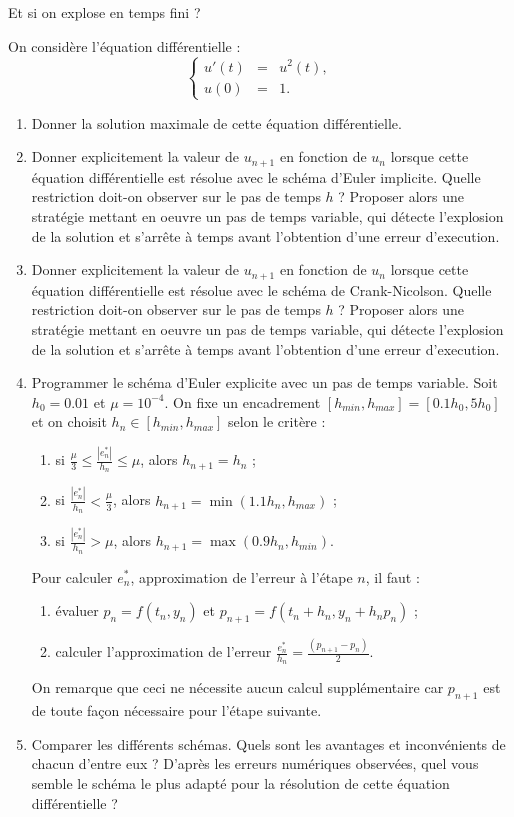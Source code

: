 \documentclass[a4paper,12pt,reqno]{amsart}
\begin{document}
\begin{exo} Et si on explose en temps fini ?

On consid\`ere l'\'equation diff\'erentielle :
$$
\left\{
\begin{array}{lcl}
u'(t)&=&u^2(t), \\
u(0)&=&1.
\end{array}
\right.
$$
\begin{enumerate}
\item Donner la solution maximale de cette \'equation diff\'erentielle.
\item
Donner explicitement la valeur de $u_{n+1}$ en fonction de $u_n$ lorsque cette \'equation 
diff\'erentielle est r\'esolue avec le sch\'ema d'Euler implicite. Quelle restriction doit-on observer sur le pas de temps $h$ ?  
Proposer alors une strat\'egie mettant en oeuvre un pas de temps variable, qui d\'etecte l'explosion de la solution et s'arr\^ete \`a temps avant l'obtention d'une erreur d'execution.
\item Donner explicitement la valeur de $u_{n+1}$ en fonction de $u_n$ lorsque cette \'equation 
diff\'erentielle est r\'esolue avec le sch\'ema de Crank-Nicolson. Quelle restriction doit-on observer sur le pas de temps $h$ ?  
Proposer alors une strat\'egie mettant en oeuvre un pas de temps variable, qui d\'etecte l'explosion de la solution et s'arr\^ete \`a temps avant l'obtention d'une erreur d'execution.
\item Programmer le sch\'ema d'Euler explicite avec un pas de temps variable. Soit $h_0=0.01$ et $\mu=10^{-4}$.
On fixe un encadrement $[h_{min},h_{max}]=[0.1 h_0, 5 h_0]$ et on choisit $h_n \in [h_{min},h_{max}]$ selon le crit\`ere :
\begin{enumerate}
\item si $\frac \mu 3 \leq \frac{|e^*_n|}{h_n} \leq \mu$, alors $h_{n+1}=h_n$ ;
\item si $\frac{|e^*_n|}{h_n} < \frac \mu 3$, alors $h_{n+1}=\min(1.1 h_n,h_{max})$ ;
\item si $\frac{|e^*_n|}{h_n} > \mu$, alors $h_{n+1}=\max(0.9 h_n,h_{min})$.
\end{enumerate}
Pour calculer $e^*_n$, approximation de l'erreur \`a l'\'etape $n$, il faut :
\begin{enumerate}
\item \'evaluer $p_n=f(t_n,y_n)$ et $p_{n+1}=f(t_n+h_n,y_n+h_n p_n)$ ;
\item calculer l'approximation de l'erreur $\frac{e^*_n}{h_n}= \frac{(p_{n+1}-p_n)}{2}$. 
\end{enumerate}
On remarque que ceci ne n\'ecessite aucun calcul suppl\'ementaire car $p_{n+1}$ est de toute fa\c con n\'ecessaire pour l'\'etape suivante.
\item
Comparer les diff\'erents sch\'emas. Quels sont les avantages et inconv\'enients de chacun d'entre eux ? 
D'apr\`es les erreurs num\'eriques observ\'ees, quel vous semble le sch\'ema le plus adapt\'e pour la r\'esolution de cette \'equation diff\'erentielle ?
\end{enumerate}
\end{exo}
\end{document}
